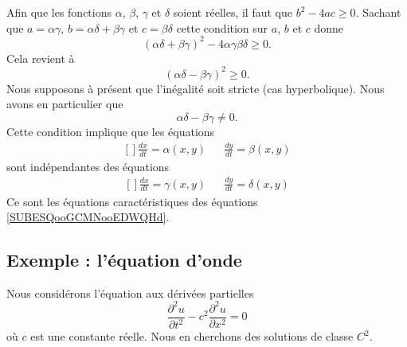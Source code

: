 Afin que les fonctions \( \alpha\), \( \beta\), \( \gamma\) et \( \delta\) soient réelles, il faut que \( b^2-4ac\geq 0\). Sachant que \( a=\alpha\gamma\), \( b=\alpha\delta+\beta\gamma\) et \( c=\beta\delta\) cette condition sur \( a\), \( b\) et \( c\) donne
\begin{equation}
	(\alpha\delta+\beta\gamma)^2-4\alpha\gamma\beta\delta\geq 0.
\end{equation}
Cela revient à
\begin{equation}
	(\alpha\delta-\beta\gamma)^2\geq 0.
\end{equation}
Nous supposons à présent que l'inégalité soit stricte (cas hyperbolique). Nous avons en particulier que
\begin{equation}
	\alpha\delta-\beta\gamma\neq 0.
\end{equation}
Cette condition implique que les équations
\begin{equation}
	\begin{aligned}[]
		\frac{ dx }{ dt }=\alpha(x,y) &  & \frac{ dy }{ dt }=\beta(x,y)
	\end{aligned}
\end{equation}
sont indépendantes des équations
\begin{equation}
	\begin{aligned}[]
		\frac{ dx }{ dt }=\gamma(x,y) &  & \frac{ dy }{ dt }=\delta(x,y)
	\end{aligned}
\end{equation}
Ce sont les équations caractéristiques des équations \eqref{SUBESQooGCMNooEDWQHd}.

\subsection{Exemple : l'équation d'onde}
\label{SUBSECooYBBKooUOIlCS}

Nous considérons l'équation aux dérivées partielles
\begin{equation}
	\frac{ \partial^2u }{ \partial t^2 }-c^2\frac{ \partial^2 u }{ \partial x^2 }=0
\end{equation}
où \( c\) est une constante réelle. Nous en cherchons des solutions de classe \( C^2\).

